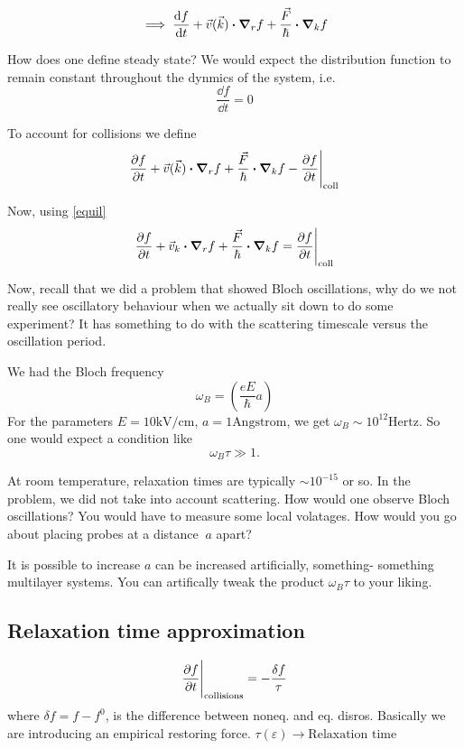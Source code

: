 \documentclass[a4paper]{article}
\begin{document}
\begin{equation}
	\implies  \frac{\dd f}{\dd t} + \vec{v}(\vec{k})\vdot\grad_rf + \frac{\vec{F}}{\hbar}\vdot\grad_k f
\end{equation}

How does one define steady state? We would expect the distribution
function  to remain constant throughout the dynmics of the system, i.e.
\begin{equation} 
	\label{equil}
	\frac{\dd f}{\dd t} = 0
\end{equation}

To account for collisions we define
\begin{equation}
	\pdv{f}{t} + \vec{v}(\vec{k})\vdot\grad_rf + \frac{\vec{F}}{\hbar}\vdot\grad_k f - \pdv{f}{t}\Bigg|_\text{coll} %
\end{equation}

Now, using \ref{equil}
\begin{equation}
	\pdv{f}{t} + \vec{v}_k\vdot\grad_rf + \frac{\vec{F}}{\hbar}\vdot\grad_kf = \pdv{f}{t}\Bigg|_\text{coll}
\end{equation}

Now, recall that we did a problem that showed Bloch oscillations,
why do we not really see oscillatory behaviour when we actually sit
down to do some experiment? It has something to do with the scattering
timescale versus the oscillation period.

We had the Bloch frequency
\begin{equation}
	\omega_B = \left( \frac{eE}{\hbar} a\right) 
\end{equation}
For the parameters $E = 10\text{kV/cm}$,  $a = 1\text{Angstrom}$, we
get  $\omega_B \sim 10^{12} \text{Hertz}$. So one would expect a
condition like
\[
\omega_B \tau \gg 1
.\] 

At room temperature, relaxation times are typically $\sim 10^{-15}$
or so. In the problem, we did not take into account scattering.
How would one observe Bloch oscillations? You would have to measure
some local volatages. How would you go about placing probes at a
distance $~a$ apart?

It is possible to increase  $a$ can be increased artificially, something-
something multilayer systems. You can artifically tweak the product
$\omega_B \tau$ to your liking.

\subsection*{Relaxation time approximation}
\begin{equation}
	\pdv{f}{t}\Bigg|_\text{collisions} = -\frac{\delta f}{\tau}
\end{equation}
where $\delta f = f - f^{0}$, is the difference between noneq. and 
eq. disros. Basically we are introducing an empirical restoring force. $\tau(\varepsilon) \to \text{Relaxation time}$
\end{document}
